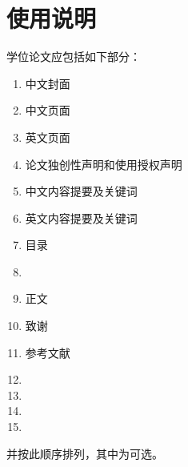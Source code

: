 ﻿\documentclass[figurelist,tablelist,algorithmlist,nomlist,masters]{seuthesis}
\begin{document}
\chapter{使用说明}
学位论文应包括如下部分：\\
\begin{enumerate}
\itshape
\item 中文封面
\item 中文页面
\item 英文页面
\item 论文独创性声明和使用授权声明
\item 中文内容提要及关键词
\item 英文内容提要及关键词
\item 目录
\item {}
\item 正文
\item 致谢
\item 参考文献
\item  {}
\item {}
\item  {}
\item {}
\end{enumerate}
并按此顺序排列，其中为可选。
\end{document}
